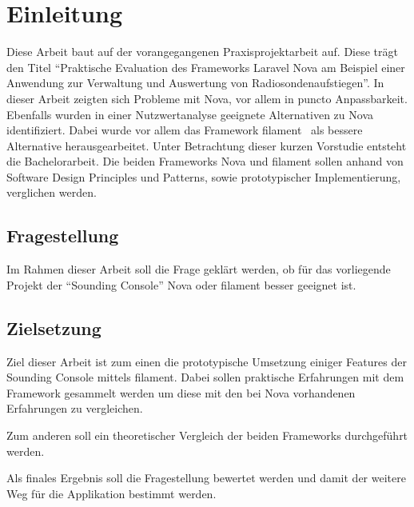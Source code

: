 \section{Einleitung}

Diese Arbeit baut auf der vorangegangenen Praxisprojektarbeit auf.
Diese trägt den Titel \enquote{Praktische Evaluation des Frameworks Laravel Nova am Beispiel einer Anwendung zur Verwaltung und Auswertung von Radiosondenaufstiegen}.
In dieser Arbeit zeigten sich Probleme mit Nova, vor allem in puncto Anpassbarkeit.
Ebenfalls wurden in einer Nutzwertanalyse geeignete Alternativen zu Nova identifiziert.
Dabei wurde vor allem das Framework filament~\cite{filament} als bessere Alternative herausgearbeitet.
Unter Betrachtung dieser kurzen Vorstudie entsteht die Bachelorarbeit.
Die beiden Frameworks Nova und filament sollen anhand von Software Design Principles und Patterns, sowie prototypischer Implementierung, verglichen werden.

\subsection{Fragestellung}
Im Rahmen dieser Arbeit soll die Frage geklärt werden, ob für das vorliegende Projekt der \enquote{Sounding Console} Nova oder filament besser geeignet ist.

\subsection{Zielsetzung}
Ziel dieser Arbeit ist zum einen die prototypische Umsetzung einiger Features der Sounding Console mittels filament.
Dabei sollen praktische Erfahrungen mit dem Framework gesammelt werden um diese mit den bei Nova vorhandenen Erfahrungen zu vergleichen.

Zum anderen soll ein theoretischer Vergleich der beiden Frameworks durchgeführt werden.

Als finales Ergebnis soll die Fragestellung bewertet werden und damit der weitere Weg für die Applikation bestimmt werden.
